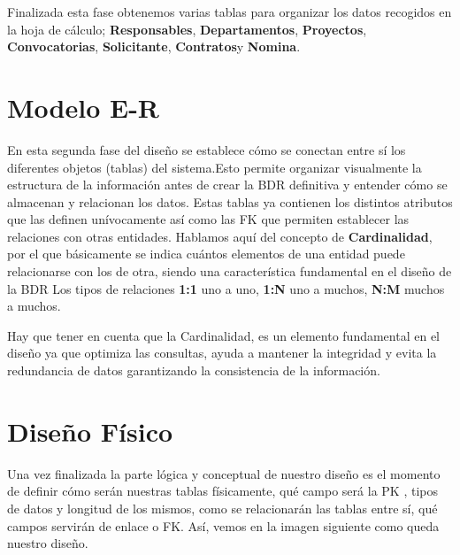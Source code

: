 Finalizada esta fase obtenemos varias tablas para organizar los datos recogidos en la hoja de cálculo; \textbf{Responsables}, \textbf{Departamentos}, \textbf{Proyectos}, \textbf{Convocatorias}, \textbf{Solicitante}, \textbf{Contratos}y \textbf{Nomina}.

\section{Modelo E-R}
En esta segunda fase del diseño se establece cómo se conectan entre sí los diferentes objetos (tablas) del sistema.Esto permite organizar visualmente la estructura de la información antes de crear la \acrshort{BDR} definitiva y entender cómo se almacenan y relacionan los datos.
Estas tablas ya contienen los distintos atributos que las definen unívocamente así como las \acrshort{FK} que permiten establecer las relaciones con otras entidades. 
Hablamos aquí del concepto de \textbf{\gls{Cardinalidad}}, por el que básicamente se indica cuántos elementos de una entidad puede relacionarse con los de otra, siendo una característica fundamental en el diseño de la \acrshort{BDR}
Los tipos de relaciones \textbf{1:1} uno a uno, \textbf{1:N} uno a muchos, \textbf{N:M} muchos a muchos.

Hay que tener en cuenta que la \gls{Cardinalidad}, es un elemento fundamental en el diseño ya que optimiza las consultas, ayuda a mantener la integridad y evita la redundancia de datos garantizando la consistencia de la información.

\section{Diseño Físico}
Una vez finalizada la parte lógica y conceptual de nuestro diseño es el momento de definir cómo serán nuestras tablas físicamente, qué campo será la \acrshort{PK} , tipos de datos y longitud de los mismos, como se relacionarán las tablas entre sí, qué campos servirán de enlace o \acrshort{FK}. Así, vemos en la imagen siguiente como queda nuestro diseño.



